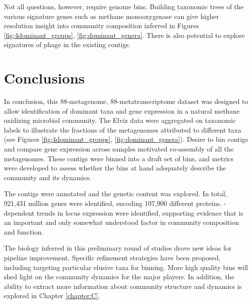 Not all questions, however, require genome bins.
Building taxonomic trees of the various signature genes such as methane monooxygenase can give higher resolution insight into community composition inferred in Figures \ref{fig:4dominant_groups}, \ref{fig:dominant_genera}.
There is also potential to explore signatures of phage in the existing contigs.


\section{Conclusions}

In conclusion, this 88-metagenome, 88-metatranscriptome dataset was designed to allow identification of dominant taxa and gene expression in a natural methane oxidizing microbial community.
The Elviz data were aggregated on taxonomic labels to illustrate the fractions of the metagenomes attributed to different taxa (see Figures \ref{fig:4dominant_groups}, \ref{fig:dominant_genera}).
Desire to bin contigs and compare gene expression across samples motivated co-assembly of all the metagenomes.
These contigs were binned into a draft set of bins, and metrics were developed to assess whether the bins at hand adequately describe the community and its dynamics.

The contigs were annotated and the genetic content was explored.
In total, 921,431 million genes were identified, encoding 107,900 different proteins.
-dependent trends in locus expression were identified, supporting evidence that  is an important and only somewhat understood factor in community composition and function.

The biology inferred in this preliminary round of studies drove new ideas for pipeline improvement.
Specific refinement strategies have been proposed, including targeting particular elusive taxa for binning.
More high quality bins will shed light on the community dynamics for the major players.
In addition, the ability to extract more information about community structure and dynamics is explored in Chapter \ref{chapter:C}.


